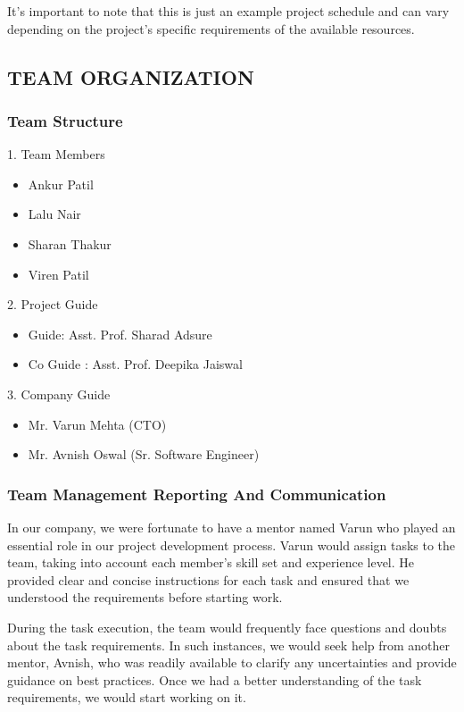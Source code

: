 \documentclass[12pt]{report}
\begin{document}
It's important to note that this is just an example project schedule and can vary depending on the project's specific requirements of the available resources.

\subsection{TEAM ORGANIZATION}
\subsubsection{Team Structure}

 1.  Team Members
\begin{itemize}
\item Ankur Patil
\item Lalu Nair
\item Sharan Thakur
\item Viren Patil
\end{itemize}
2.  Project Guide
\begin{itemize}
\item Guide: Asst. Prof. Sharad Adsure 
\item Co Guide : Asst. Prof. Deepika Jaiswal  
\end{itemize}
3.  Company Guide
\begin{itemize}
\item Mr. Varun Mehta (CTO) 
\item Mr. Avnish Oswal (Sr. Software Engineer)
\end{itemize}

\subsubsection{Team Management Reporting And Communication}
\justifying
\setlength{\parindent}{2em}
\setlength{\parskip}{0.5em}

In our company, we were fortunate to have a mentor named Varun who played an essential role in our project development process. Varun would assign tasks to the team, taking into account each member's skill set and experience level. He provided clear and concise instructions for each task and ensured that we understood the requirements before starting work.

During the task execution, the team would frequently face questions and doubts about the task requirements. In such instances, we would seek help from another mentor, Avnish, who was readily available to clarify any uncertainties and provide guidance on best practices. Once we had a better understanding of the task requirements, we would start working on it.
\end{document}
